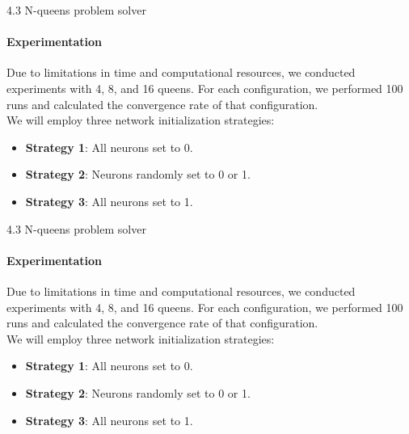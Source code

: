 \documentclass[11pt, aspectratio=169]{beamer}
\begin{document}
\begin{frame}{4.3 N-queens problem solver}
\framesubtitle{Experimentation}
Due to limitations in time and computational resources, we conducted experiments with 4, 8, and 16 queens. For each configuration, we performed 100 runs and calculated the convergence rate of that configuration.\\
We will employ three network initialization strategies:
\begin{itemize}
    \item \textbf{Strategy 1}: All neurons set to 0.
    \item \textbf{Strategy 2}: Neurons randomly set to 0 or 1.
    \item \textbf{Strategy 3}: All neurons set to 1.
\end{itemize}
\end{frame}

\begin{frame}{4.3 N-queens problem solver}
\framesubtitle{Experimentation}
Due to limitations in time and computational resources, we conducted experiments with 4, 8, and 16 queens. For each configuration, we performed 100 runs and calculated the convergence rate of that configuration.\\
We will employ three network initialization strategies:
\begin{itemize}
    \item \textbf{Strategy 1}: All neurons set to 0.
    \item \textbf{Strategy 2}: Neurons randomly set to 0 or 1.
    \item \textbf{Strategy 3}: All neurons set to 1.
\end{itemize}

\end{frame}
\end{document}
